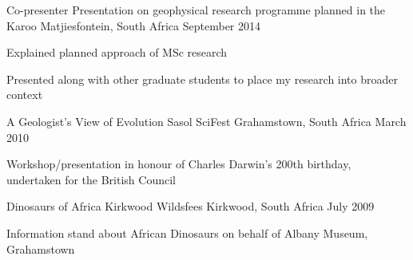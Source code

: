 


\begin{cventries}


\cventry
{Co-presenter}
{Presentation on geophysical research programme planned in the Karoo} %
{Matjiesfontein, South Africa} %
{September 2014} %
{ %
\begin{cvitems}
\item {Explained planned approach of MSc research}
\item {Presented along with other graduate students to place my research into broader context}
\end{cvitems}
}


\cventry
{A Geologist's View of Evolution} %
{Sasol SciFest} %
{Grahamstown, South Africa} %
{March 2010} %
{ %
\begin{cvitems}
\item {Workshop/presentation in honour of Charles Darwin's 200th birthday, undertaken for the British Council}
\end{cvitems}
}


\cventry
{Dinosaurs of Africa} %
{Kirkwood Wildsfees} %
{Kirkwood, South Africa} %
{July 2009} %
{ %
\begin{cvitems}
\item {Information stand about African Dinosaurs on behalf of Albany Museum, Grahamstown}
\end{cvitems}
}

\end{cventries}